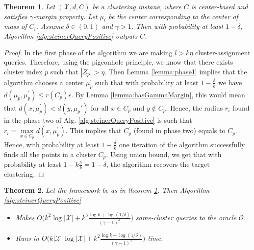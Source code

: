 \documentclass{article}
\newcommand{\mc}{\mathcal}
\newtheorem{theorem}{Theorem}
\begin{document}
\begin{theorem}
\label{thm:steinerQueryPositive}
Let $(\mc X, d, C)$ be a clustering instane, where $C$ is center-based and satisfies $\gamma$-margin property. Let $\mu_i$ be the center corresponding to the center of mass of $C_i$.
Assume $\delta \in (0, 1)$ and $\gamma > 1$. Then with probability at least $1-\delta$, Algorithm \ref{alg:steinerQueryPositive} outputs $C$.
\end{theorem}

\begin{proof}
In the first phase of the algorithm we are making $l>k\eta$ cluster-assignment queries. Therefore, using the pigeonhole principle, we know that there exists cluster index $p$ such that $|Z_p| > \eta$. Then Lemma \ref{lemma:phase1} implies that the algorithm chooses a center $\mu_p^\prime$ such that with probability at least $1-\frac{\delta}{k}$ we have $d(\mu_p, \mu_p^\prime) \le r(C_p)\epsilon$. By Lemma \ref{lemma:hasGammaMargin}, this would mean that $d(x, \mu_p^\prime) < d(y, \mu_p')$ for all $x \in C_p$ and $y \not\in C_p$. Hence, the radius $r_i$ found in the phase two of Alg. \ref{alg:steinerQueryPositive} is such that $r_{i} = \max\limits_{x \in C_p} d(x, \mu_p^\prime)$. This implies that $C_p^\prime$ (found in phase two) equals to $C_p$. Hence, with probability at least $1-\frac{\delta}{k}$ one iteration of the algorithm successfully finds all the points in a cluster $C_p$. Using union bound, we get that with probability at least $1-k\frac{\delta}{k} = 1-\delta$, the algorithm recovers the target clustering.
\end{proof}

\begin{theorem}
\label{thm:steinerQueryPositiveComplexity}
Let the framework be as in theorem \ref{thm:steinerQueryPositive}. Then Algorithm \ref{alg:steinerQueryPositive} 
\begin{itemize}[nolistsep,noitemsep]
\item Makes $O\big(k^2\log |\mc X| + k^3\frac{\log k + \log (1/\delta)}{(\gamma - 1)^4}\big)$ same-cluster queries to the oracle $\mc O$.
\item Runs in $O\big(k|\mc X|\log |\mc X| + k^2\frac{\log k + \log (1/\delta)}{(\gamma - 1)^4}\big)$ time.
\end{itemize}
\end{theorem}
\end{document}

